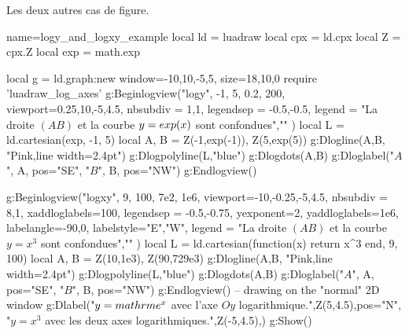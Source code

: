 \begin{demo}{Les deux autres cas de figure.}
\begin{luadraw}{name=logy_and_logxy_example}
local ld = luadraw
local cpx = ld.cpx
local Z = cpx.Z
local  exp = math.exp

local g = ld.graph:new{ window={-10,10,-5,5}, size={18,10,0} }
require 'luadraw_log_axes'
g:Beginlogview("logy", -1, 5, 0.2, 200, { viewport={0.25,10,-5,4.5},
    nbsubdiv = {1,1},
    legendsep = {-0.5,-0.5},
    legend = {"La droite $(AB)$ et la courbe $y=\\exp(x)$ sont confondues",""}
})
local L = ld.cartesian(exp, -1, 5)
local A, B = Z(-1,exp(-1)), Z(5,exp(5))
g:Dlogline(A,B, "Pink,line width=2.4pt")
g:Dlogpolyline(L,"blue") 
g:Dlogdots({A,B})
g:Dloglabel("$A$", A, {pos="SE"}, "$B$", B, {pos="NW"})
g:Endlogview()

g:Beginlogview("logxy", 9, 100, 7e2, 1e6, { viewport={-10,-0.25,-5,4.5},
    nbsubdiv = {8,1},
    xaddloglabels={100},
    legendsep = {-0.5,-0.75},
    yexponent=2,
    yaddloglabels={1e6}, 
    labelangle={-90,0}, labelstyle={"E","W"},
    legend = {"La droite $(AB)$ et la courbe $y=x^3$ sont confondues",""}
})
local L = ld.cartesian(function(x) return x^3 end, 9, 100)
local A, B = Z(10,1e3), Z(90,729e3)
g:Dlogline(A,B, "Pink,line width=2.4pt")
g:Dlogpolyline(L,"blue") 
g:Dlogdots({A,B})
g:Dloglabel("$A$", A, {pos="SE"}, "$B$", B, {pos="NW"})
g:Endlogview()
-- drawing on the "normal" 2D window
g:Dlabel("$y=\\mathrm{e}^x$ avec l'axe $Oy$ logarithmique.",Z(5,4.5),{pos="N"},
  "$y=x^3$ avec les deux axes logarithmiques.",Z(-5,4.5),{})
g:Show()
\end{luadraw}
\end{demo}

